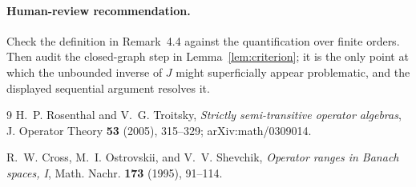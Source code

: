 \documentclass[11pt]{article}
\begin{document}
\paragraph{Human-review recommendation.}
Check the definition in Remark~4.4 against the quantification over finite
orders.  Then audit the closed-graph step in Lemma~\ref{lem:criterion}; it is
the only point at which the unbounded inverse of $J$ might superficially appear
problematic, and the displayed sequential argument resolves it.

\begin{thebibliography}{9}
H.~P. Rosenthal and V.~G. Troitsky,
\emph{Strictly semi-transitive operator algebras},
J. Operator Theory \textbf{53} (2005), 315--329;
arXiv:math/0309014.

R.~W. Cross, M.~I. Ostrovskii, and V.~V. Shevchik,
\emph{Operator ranges in Banach spaces, I},
Math. Nachr. \textbf{173} (1995), 91--114.
\end{thebibliography}
\end{document}
